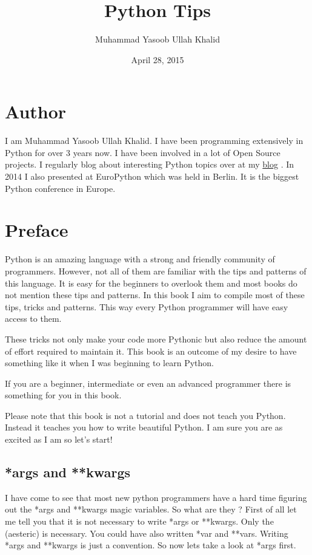 \documentclass[a4paper,12pt,oneside]{sphinxmanual}
\title{Python Tips}
\date{April 28, 2015}
\author{Muhammad Yasoob Ullah Khalid}
\begin{document}
\maketitle
\tableofcontents
{}\label{index::doc}



\part{Author}
\label{index:python-tips}\label{index:author}
I am Muhammad Yasoob Ullah Khalid. I have been programming extensively in Python for over 3 years now. I have been involved in a lot of Open Source projects. I regularly blog about interesting Python topics over at my \href{http://www.freepythontips.wordpress.com}{blog} . In 2014 I also presented at EuroPython which was held in Berlin. It is the biggest Python conference in Europe.


\part{Preface}
\label{index:preface}
Python is an amazing language with a strong and friendly community of programmers. However, not all of them are familiar with the tips and patterns of this language. It is easy for the beginners to overlook them and most books do not mention these tips and patterns. In this book I aim to compile most of these tips, tricks and patterns. This way every Python programmer will have easy access to them.

These tricks not only make your code more Pythonic but also reduce the amount of effort required to maintain it. This book is an outcome of my desire to have something like it when I was beginning to learn Python.

If you are a beginner, intermediate or even an advanced programmer there is something for you in this book.

Please note that this book is not a tutorial and does not teach you Python. Instead it teaches you how to write beautiful Python. I am sure you are as excited as I am so let's start!


\chapter{*args and **kwargs}
\label{args_and_kwargs:args-and-kwargs}\label{args_and_kwargs::doc}
I have come to see that most new python programmers have a hard time
figuring out the *args and **kwargs magic variables. So what are they
? First of all let me tell you that it is not necessary to write *args
or **kwargs. Only the \code{*} (aesteric) is necessary. You could have
also written *var and **vars. Writing *args and **kwargs is just a
convention. So now lets take a look at *args first.
\end{document}
